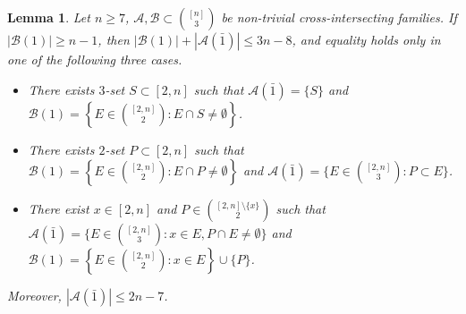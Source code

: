 \documentclass[a4paper,11pt]{article}
\newtheorem{lemma}[theorem]{Lemma}
\newcommand{\m}{\mathcal}
\begin{document}
\begin{lemma}\label{end2}
Let $n\ge 7$, $\m A, \m B \subset {[n]\choose 3}$ be non-trivial cross-intersecting families. 
If $|\m B(1)|\ge n-1$, then $|\m B(1)|+|\m A(\bar1)|\le 3n-8$, and equality holds only in one of the following three cases.
\begin{itemize}
\item[\rm (i)]
There exists $3$-set $S\subset [2,n]$ such that
$\m A(\bar1)=\{S\}$ and 
$\m B(1)=\left\{E\in\binom{[2,n]}{2}:E\cap S\ne\emptyset\right\}$.
\item[\rm (ii)]
There exists $2$-set $P\subset [2,n]$ such that $\m B(1)=\left\{E\in\binom{[2,n]}{2}:E\cap P\ne\emptyset\right\}$ and
$\m A(\bar1)=\{E\in \binom{[2,n]}{3}:P\subset E\}$.
\item[\rm (iii)]
There exist $x\in [2,n]$ and $P\in\binom{[2,n]\setminus\{x\}}2$ such that
$\m A(\bar1)=\{E\in \binom{[2,n]}{3}:x\in E, P\cap E\ne\emptyset\}$ and 
$\m B(1)=\left\{E\in\binom{[2,n]}{2}:x\in E\right\}\cup\{P\}$.
\end{itemize}
Moreover, $|\m A(\bar1)|\le 2n-7$. 
\end{lemma}
\end{document}
